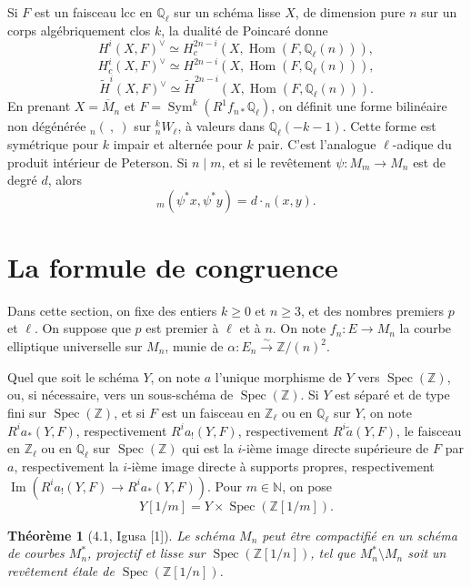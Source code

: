 \documentclass[10pt]{article}
\newcommand{\Q}{\mathbb Q}
\newcommand{\Z}{\mathbb Z}
\newcommand{\Hom}{\operatorname{Hom}}
\newcommand{\Sym}{\operatorname{Sym}}
\newcommand{\Spec}{\operatorname{Spec}}
\newcommand{\Imop}{\operatorname{Im}}
\newtheorem*{theorem}{Théorème}
\begin{document}
Si $F$ est un faisceau lcc en $\Q_\ell$ sur un schéma lisse $X$, de dimension pure $n$ sur un corps algébriquement clos $k$, la dualité de Poincaré donne
\[
H^i(X,F)^\vee\simeq H_c^{2n-i}(X,\Hom(F,\Q_\ell(n))),
\]
\[
H_c^i(X,F)^\vee\simeq H^{2n-i}(X,\Hom(F,\Q_\ell(n))),
\]
\[
\widetilde H^i(X,F)^\vee\simeq \widetilde H^{2n-i}(X,\Hom(F,\Q_\ell(n))).
\]
En prenant $X=\overline M_n$ et $F=\Sym^k(R^1f_{n*}\Q_\ell)$, on définit une forme bilinéaire non dégénérée ${}_n(\ ,\ )$ sur ${}^k_nW_\ell$, à valeurs dans $\Q_\ell(-k-1)$. Cette forme est symétrique pour $k$ impair et alternée pour $k$ pair. C'est l'analogue $\ell$-adique du produit intérieur de Peterson. Si $n\mid m$, et si le revêtement $\psi:M_m\to M_n$ est de degré $d$, alors
\[
{}_m(\psi^*x,\psi^*y)=d\cdot {}_n(x,y).
\]

\section{La formule de congruence}

Dans cette section, on fixe des entiers $k\geq 0$ et $n\geq 3$, et des nombres premiers $p$ et $\ell$. On suppose que $p$ est premier à $\ell$ et à $n$. On note $f_n:E\to M_n$ la courbe elliptique universelle sur $M_n$, munie de $\alpha:E_n\xrightarrow{\sim}\Z/(n)^2$.

Quel que soit le schéma $Y$, on note $a$ l'unique morphisme de $Y$ vers $\Spec(\Z)$, ou, si nécessaire, vers un sous-schéma de $\Spec(\Z)$. Si $Y$ est séparé et de type fini sur $\Spec(\Z)$, et si $F$ est un faisceau en $\Z_\ell$ ou en $\Q_\ell$ sur $Y$, on note $R^ia_*(Y,F)$, respectivement $R^ia_!(Y,F)$, respectivement $R^i\widetilde a(Y,F)$, le faisceau en $\Z_\ell$ ou en $\Q_\ell$ sur $\Spec(\Z)$ qui est la $i$-ième image directe supérieure de $F$ par $a$, respectivement la $i$-ième image directe à supports propres, respectivement $\Imop(R^ia_!(Y,F)\to R^ia_*(Y,F))$. Pour $m\in\mathbb N$, on pose
\[
Y[1/m]=Y\times\Spec(\Z[1/m]).
\]

\begin{theorem}[4.1, Igusa {\rm [1]}]
Le schéma $M_n$ peut être compactifié en un schéma de courbes $M_n^*$, projectif et lisse sur $\Spec(\Z[1/n])$, tel que $M_n^*\setminus M_n$ soit un revêtement étale de $\Spec(\Z[1/n])$.
\end{theorem}
\end{document}
